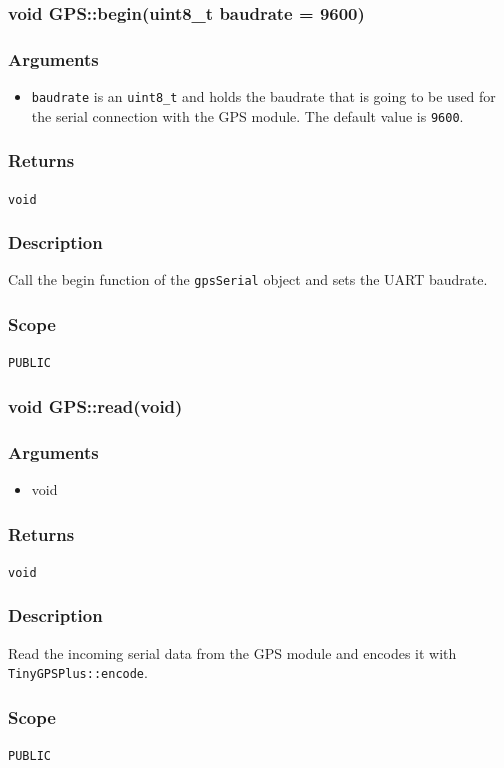 \documentclass[a4paper,10pt]{article}
\newcommand{\func}[1]{\texttt{#1}}
\newenvironment{method}[2]{%
	\newcommand\funname{\func{#1}}
	\subsubsection[#1]{#2}
	
	\newenvironment{methodargs}{%
		\subsubsection*{Arguments}
	}{}
	
	\newenvironment{methodreturns}{%
		\subsubsection*{Returns}
	}{}
	
	\newenvironment{methoddesc}{%
		\subsubsection*{Description}
	}{}

	\newenvironment{methodscope}{
		\subsubsection*{Scope}
	}{}
}{}
\begin{document}
			\begin{method}{begin}{void GPS::begin(uint8\_t baudrate = 9600)}
				\begin{methodargs}
					\begin{itemize}
						\item \texttt{baudrate} is an \texttt{uint8\_t} and holds the baudrate that is going to be used for the serial connection with the GPS module. The default value is \texttt{9600}. 
					\end{itemize}
				\end{methodargs}
			
				\begin{methodreturns}
					\texttt{void}
				\end{methodreturns}
			
				\begin{methoddesc}
					Call the begin function of the \texttt{gpsSerial} object and sets the UART baudrate. 
				\end{methoddesc}
			
				\begin{methodscope}
					\texttt{PUBLIC}
				\end{methodscope}
			\end{method}
			
			\begin{method}{read}{void GPS::read(void)}
				\begin{methodargs}
					\begin{itemize}
							\item void
						\end{itemize}
				\end{methodargs}
				
				\begin{methodreturns}
					\texttt{void}
				\end{methodreturns}
				
				\begin{methoddesc}
					Read the incoming serial data from the GPS module and encodes it with \texttt{TinyGPSPlus::encode}. 
				\end{methoddesc}
				
				\begin{methodscope}
					\texttt{PUBLIC}
				\end{methodscope}
				
				\vspace{3ex}
			\end{method}
		
\end{document}
